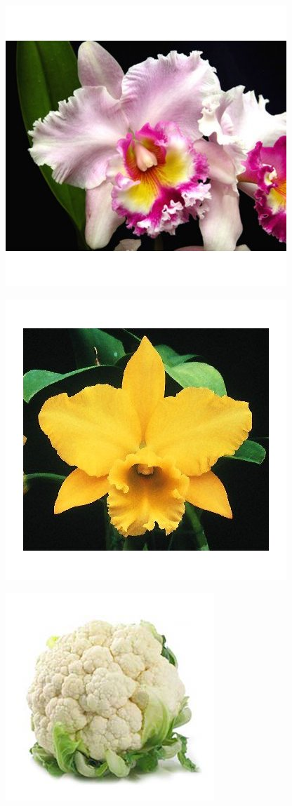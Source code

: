 \documentclass{article}
\begin{document}
\begin{center}
\includegraphics[width=0.9\textheight, angle=90]{../Cattleya2.jpg}
\end{center}
\newpage

\begin{center}
\includegraphics[width=0.9\textheight, angle=90]{../Cattleya3.jpg}
\end{center}
\newpage

\begin{center}
\includegraphics[width=0.9\textheight, angle=90]{../Cauliflower.jpg}
\end{center}
\newpage
\end{document}
